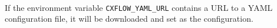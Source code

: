 
\noindent\\If the environment variable \texttt{CXFLOW\_YAML\_URL} contains a URL to a \cxflow YAML
configuration file, it will be downloaded and set as the \cxflow configuration.
